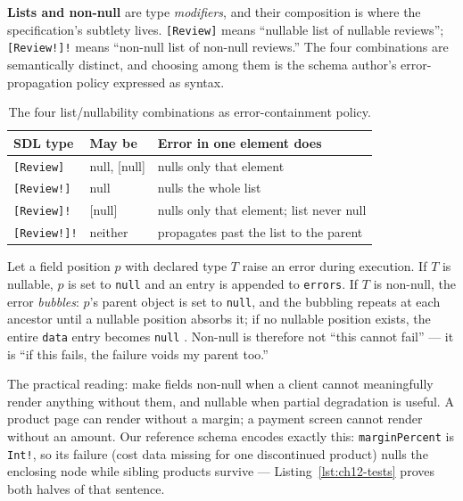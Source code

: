 \textbf{Lists and non-null} are type \emph{modifiers}, and their
composition is where the specification's subtlety lives. \texttt{[Review]}
means ``nullable list of nullable reviews''; \texttt{[Review!]!} means
``non-null list of non-null reviews.'' The four combinations are
semantically distinct, and choosing among them is the schema author's
error-propagation policy expressed as syntax.

\begin{table}[h]
  \centering
  \small
  \begin{tabularx}{\textwidth}{l l X}
    \toprule
    \textbf{SDL type} & \textbf{May be} & \textbf{Error in one element does} \\
    \midrule
    \texttt{[Review]}   & null, [null] & nulls only that element \\
    \texttt{[Review!]}  & null         & nulls the whole list \\
    \texttt{[Review]!}  & [null]       & nulls only that element; list never null \\
    \texttt{[Review!]!} & neither      & propagates past the list to the parent \\
    \bottomrule
  \end{tabularx}
  \caption{The four list/nullability combinations as error-containment policy.}
  \label{tab:ch12-nullability}
\end{table}

\begin{definition}
\label{def:null-propagation}
Let a field position $p$ with declared type $T$ raise an error during
execution. If $T$ is nullable, $p$ is set to \texttt{null} and an entry is
appended to \texttt{errors}. If $T$ is non-null, the error \emph{bubbles}:
$p$'s parent object is set to \texttt{null}, and the bubbling repeats at
each ancestor until a nullable position absorbs it; if no nullable
position exists, the entire \texttt{data} entry becomes \texttt{null}
\cite{graphqlspec}. Non-null is therefore not ``this cannot fail'' --- it
is ``if this fails, the failure voids my parent too.''
\end{definition}

The practical reading: make fields non-null when a client cannot
meaningfully render anything without them, and nullable when partial
degradation is useful. A product page can render without a margin; a
payment screen cannot render without an amount. Our reference schema
encodes exactly this: \texttt{marginPercent} is \texttt{Int!}, so its
failure (cost data missing for one discontinued product) nulls the
enclosing node while sibling products survive ---
Listing~\ref{lst:ch12-tests} proves both halves of that sentence.

